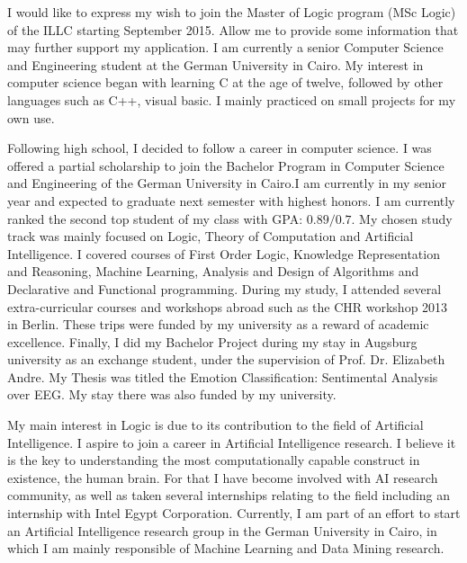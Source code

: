 \documentclass[10pt,stdletter,dateno,sigleft]{newlfm} %
\begin{document}
\begin{newlfm}


  I would like to express my wish to join the Master of Logic program (MSc
  Logic) of the ILLC starting September 2015.
  Allow me to provide some information that may further support my application.
  I am currently a senior Computer Science and Engineering student at the German
  University in Cairo. My interest in computer science began with learning C at the age of twelve,
  followed by other languages such as C++, visual basic. I mainly practiced on
  small projects for my own use.  

  Following high school, I decided to follow a career in computer science. I was
  offered a partial scholarship to join the Bachelor Program in Computer Science
  and Engineering of the German University in Cairo.I am currently in my senior
  year and expected to graduate next semester with highest honors. I am
  currently ranked the second top student of my class with GPA: $0.89/0.7$. My
  chosen study track was mainly focused on Logic,  Theory of Computation and
  Artificial Intelligence. I covered courses of First Order Logic,  Knowledge
  Representation and Reasoning, Machine Learning,  Analysis and Design of
  Algorithms and Declarative and Functional
  programming. During my study, I attended several extra-curricular courses and
  workshops abroad such as the CHR workshop 2013 in Berlin. These trips were
  funded by my university as a reward of academic excellence. Finally, I did my
  Bachelor Project during my stay in Augsburg university as an exchange student,
  under the supervision of Prof. Dr. Elizabeth Andre. My Thesis was titled the
  Emotion Classification: Sentimental Analysis over EEG. My stay there was also
  funded by my university.
  
  My main interest in Logic is due to its contribution to the field of
  Artificial Intelligence. I aspire to join a career in Artificial Intelligence
  research. I believe it is the key to understanding the most computationally
  capable construct in existence, the human brain. For that I have become
  involved with AI research community, as well as taken several internships
  relating to the field including an internship with Intel Egypt Corporation.
  Currently, I am part of an effort to start an Artificial Intelligence research
  group in the German University in Cairo, in which I am mainly responsible of
  Machine Learning and Data Mining research.


\end{newlfm}
\end{document}
